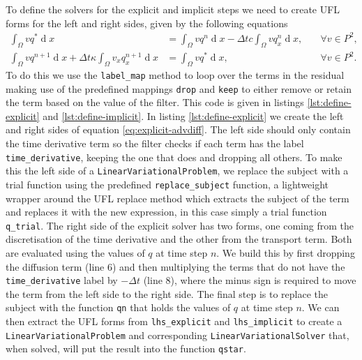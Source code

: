 \documentclass[journal abbreviation, manuscript]{copernicus}
\DeclareMathOperator{\diff}{d}
\begin{document}


To define the solvers for the explicit and implicit steps we need to create UFL forms for the left and right sides, given by the following equations
\begin{align}
  \label{eq:explicit-advdiff}
  \int_\Omega vq^* \diff x &= \int_\Omega vq^n \diff x - \Delta t c \int_\Omega v q_x^n \diff x, &\quad \forall v \in P^2, \\
  \label{eq:implicit-advdiff}
  \int_\Omega vq^{n+1} \diff x  + \Delta t \kappa \int_\Omega v_x q_x^{n+1} \diff x &= \int_\Omega vq^* \diff x, &\quad \forall v \in P^2.
\end{align}
To do this we use the \texttt{label\_map} method to loop over the
terms in the residual making use of the predefined mappings
\texttt{drop} and \texttt{keep} to either remove or retain the term
based on the value of the filter. This code is given in listings
\ref{lst:define-explicit} and \ref{lst:define-implicit}. In listing
\ref{lst:define-explicit} we create the left and right sides of
equation \ref{eq:explicit-advdiff}. The left side should only contain
the time derivative term so the filter checks if each term has the
label \texttt{time\_derivative}, keeping the one that does and
dropping all others. To make this the left side of a
\texttt{LinearVariationalProblem}, we replace the subject with a trial
function using the predefined \texttt{replace\_subject} function, a
lightweight wrapper around the UFL replace method which extracts the
subject of the term and replaces it with the new expression, in this
case simply a trial function \texttt{q\_trial}. The right side of the
explicit solver has two forms, one coming from the discretisation of
the time derivative and the other from the transport term. Both are
evaluated using the values of $q$ at time step $n$. We build this by
first dropping the diffusion term (line 6) and then multiplying the
terms that do not have the \texttt{time\_derivative} label by $-\Delta
t$ (line 8), where the minus sign is required to move the term from
the left side to the right side. The final step is to replace the
subject with the function \texttt{qn} that holds the values of $q$ at
time step $n$. We can then extract the UFL forms from
\texttt{lhs\_explicit} and \texttt{lhs\_implicit} to create a
\texttt{LinearVariationalProblem} and corresponding
\texttt{LinearVariationalSolver} that, when solved, will put the
result into the function \texttt{qstar}.
\end{document}
